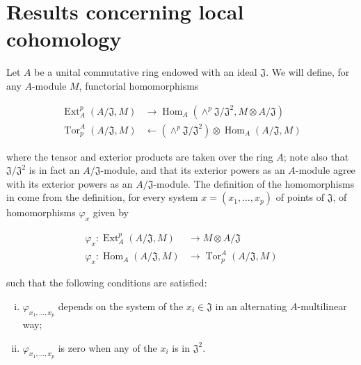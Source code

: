 \section{Results concerning local cohomology}\label{fga1-3}

Let $A$ be a unital commutative ring endowed with an ideal $\mathfrak{J}$.
We will define, for any $A$-module $M$, functorial homomorphisms

\begin{equation}\tag{3.1}\label{fga1-equation-3.1}
  \begin{aligned}
    \operatorname{Ext}_A^p(A/\mathfrak{J},M)
     & \to \operatorname{Hom}_A(\wedge^p\mathfrak{J}/\mathfrak{J}^2,M\otimes A/\mathfrak{J})
    \\\operatorname{Tor}_p^A(A/\mathfrak{J},M)
     & \leftarrow (\wedge^p\mathfrak{J}/\mathfrak{J}^2)\otimes\operatorname{Hom}_A(A/\mathfrak{J},M)
  \end{aligned}
\end{equation}

where the tensor and exterior products are taken over the ring $A$;
note also that $\mathfrak{J}/\mathfrak{J}^2$ is in fact an $A/\mathfrak{J}$-module, and that its exterior powers as an $A$-module agree with its exterior powers as an $A/\mathfrak{J}$-module.
The definition of the homomorphisms in  come from the definition, for every system $x=(x_1,\ldots,x_p)$ of points of $\mathfrak{J}$, of homomorphisms $\varphi_x$ given by

\begin{equation}\tag{3.2}\label{fga1-equation-3.2}
  \begin{aligned}
    \varphi_x\colon \operatorname{Ext}_A^p(A/\mathfrak{J},M) & \to M\otimes A/\mathfrak{J}
    \\\varphi_x\colon \operatorname{Hom}_A(A/\mathfrak{J},M) &\to \operatorname{Tor}_p^A(A/\mathfrak{J},M)
  \end{aligned}
\end{equation}

such that the following conditions are satisfied:

\begin{enumerate}[i.]
  \item $\varphi_{x_1,\ldots,x_p}$ depends on the system of the $x_i\in\mathfrak{J}$ in an alternating $A$-multilinear way;
  \item $\varphi_{x_1,\ldots,x_p}$ is zero when any of the $x_i$ is in $\mathfrak{J}^2$.
\end{enumerate}


